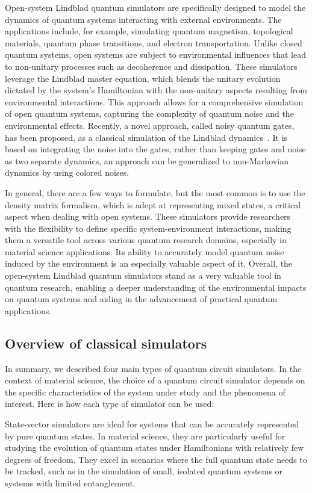 Open-system Lindblad quantum simulators are specifically designed to model the dynamics of quantum systems interacting with external environments. The applications include, for example, simulating quantum magnetism, topological materials, 
quantum phase transitions, and electron transportation. Unlike closed quantum systems, open systems are subject to environmental influences that lead to non-unitary processes such as decoherence and dissipation. These simulators leverage the Lindblad master equation, which blends the unitary evolution dictated by the system's Hamiltonian with the non-unitary aspects resulting from environmental interactions. This approach allows for a comprehensive simulation of open quantum systems, capturing the complexity of quantum noise and the environmental effects. Recently, a novel approach, called noisy quantum gates, has been proposed, as a classical simulation of the Lindblad dynamics~\cite{noisygates}. It is based on integrating the noise into the gates, rather than keeping gates and noise as two separate dynamics, an approach can be generalized to non-Markovian dynamics by using colored noises.

In general, there are a few ways to formulate, but the most common is to use the density matrix formalism, which is adept at representing mixed states, a critical aspect when dealing with open systems. These simulators provide researchers with the flexibility to define specific system-environment interactions, making them a versatile tool across various quantum research domains, especially in material science applications. Its ability to accurately model quantum noise induced by the environment is an especially valuable aspect of it. Overall, the open-system Lindblad quantum simulators stand as a very valuable tool in quantum research, enabling a deeper understanding of the environmental impacts on quantum systems and aiding in the advancement of practical quantum applications.


\subsection{Overview of classical simulators}

In summary, we described four main types of quantum circuit simulators. In the context of material science, the choice of a quantum circuit simulator depends on the specific characteristics of the system under study and the phenomena of interest. Here is how each type of simulator can be used:

State-vector simulators are ideal for systems that can be accurately represented by pure quantum states. In material science, they are particularly useful for studying the evolution of quantum states under Hamiltonians with relatively few degrees of freedom. They excel in scenarios where the full quantum state needs to be tracked, such as in the simulation of small, isolated quantum systems or systems with limited entanglement.

